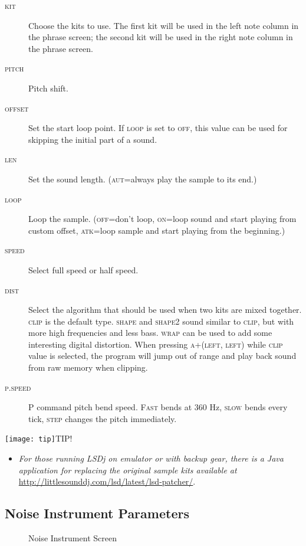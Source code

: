 \begin{description}
	\item[\textsc{kit}] Choose the kits to use. The first kit will be used in the left note column in the phrase screen; the second kit will be used in the right note column in the phrase screen.
	\item[\textsc{pitch}] Pitch shift.
	\item[\textsc{offset}] Set the start loop point. If \textsc{loop} is set to \textsc{off}, this value can be used for skipping the initial part of a sound.
	\item[\textsc{len}] Set the sound length. (\textsc{aut}=always play the sample to its end.)
	\item[\textsc{loop}] Loop the sample. (\textsc{off}=don't loop, \textsc{on}=loop sound and start playing from custom offset, \textsc{atk}=loop sample and start playing from the beginning.)
	\item[\textsc{speed}] Select full speed or half speed.
	\item[\textsc{dist}] Select the algorithm that should be used when two kits are mixed together. \textsc{clip} is the default type. \textsc{shape} and \textsc{shape2} sound similar to \textsc{clip}, but with more high frequencies and less bass. \textsc{wrap} can be used to add some interesting digital distortion. When pressing \textsc{a+(left, left)} while \textsc{clip} value is selected, the program will jump out of range and play back sound from raw memory when clipping.
    \item[\textsc{p.speed}] \textsc{P} command pitch bend speed. \textsc{Fast} bends at 360 Hz, \textsc{slow} bends every tick, \textsc{step} changes the pitch immediately.
\end{description}

\texttt{[image: tip]}TIP!
\begin{itemize}
	\item \textit{For those running LSDj on emulator or with backup gear, there is a Java application for replacing the original sample kits available at} \url{http://littlesounddj.com/lsd/latest/lsd-patcher/}.
\end{itemize}

\subsection{Noise Instrument Parameters}

\begin{figure}[htpb]
	\begin{center}
	\end{center}
	\caption{Noise Instrument Screen}
	\label{fig:instr-noise}
\end{figure}

